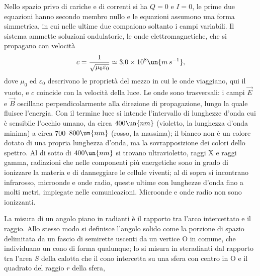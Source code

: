 \documentclass[main.tex]{subfiles}
\begin{document}
Nello spazio privo di cariche e di correnti si ha $Q=0$ e $I=0$, le prime due equazioni hanno secondo membro nullo e le equazioni assumono una forma simmetrica, in cui nelle ultime due compaiono soltanto i campi variabili. Il sistema ammette soluzioni ondulatorie, le onde elettromagnetiche, che si propagano con velocità
\[
c=\frac{1}{\sqrt{\mu_0\varepsilon_0}}\simeq3{,}0\times10^{8}\un{m\,s^{-1}},
\]
dove $\mu_0$ ed $\varepsilon_0$ descrivono le proprietà del mezzo in cui le onde viaggiano, qui il vuoto, e $c$ coincide con la velocità della luce. Le onde sono trasversali: i campi $\vec E$ e $\vec B$ oscillano perpendicolarmente alla direzione di propagazione, lungo la quale fluisce l'energia. %
Con il termine luce si intende l'intervallo di lunghezze d'onda cui è sensibile l'occhio umano, da circa $400\un{nm}$ (violetto, la lunghezza d'onda minima) a circa $700$--$800\un{nm}$ (rosso, la massima); il bianco non è un colore dotato di una propria lunghezza d'onda, ma la sovrapposizione dei colori dello spettro. Al di sotto di $400\un{nm}$ si trovano ultravioletto, raggi X e raggi gamma, radiazioni che nelle componenti più energetiche sono in grado di ionizzare la materia e di danneggiare le cellule viventi; al di sopra si incontrano infrarosso, microonde e onde radio, queste ultime con lunghezze d'onda fino a molti metri, impiegate nelle comunicazioni. Microonde e onde radio non sono ionizzanti.

La misura di un angolo piano in radianti è il rapporto tra l'arco intercettato e il raggio. Allo stesso modo si definisce l'angolo solido come la porzione di spazio delimitata da un fascio di semirette uscenti da un vertice O in comune, che individuano un cono di forma qualunque; lo si misura in steradianti dal rapporto tra l'area $S$ della calotta che il cono intercetta su una sfera con centro in O e il quadrato del raggio $r$ della sfera,
\end{document}

